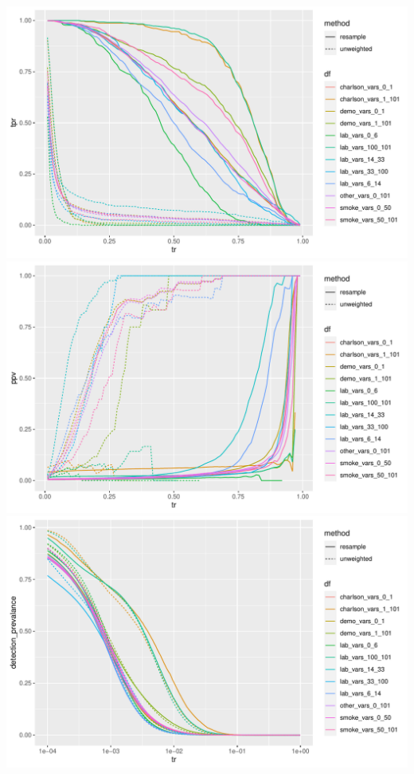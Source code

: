 \documentclass[12pt]{article}
\begin{document}
\begin{center}
\includegraphics[width=.7\textwidth]{tpr_vars.pdf}
\includegraphics[width=.7\textwidth]{ppv_vars.pdf}
\includegraphics[width=.7\textwidth]{dp_vars.pdf}
\end{center}
\end{document}
